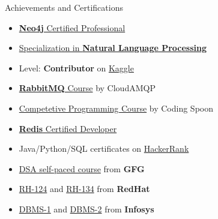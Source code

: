 \documentclass{resume} %
\begin{document}
\begin{rSection}{Achievements and Certifications}
    \begin{minipage}[t]{0.45\textwidth}
        \begin{itemize}[noitemsep]
            \item \href{https://graphacademy.neo4j.com/c/5fc672a6-5bf9-4611-aaba-bbe70f24ede8/}{{\bf Neo4j} Certified Professional}
            \item \href{https://www.coursera.org/account/accomplishments/specialization/MPYFQ8ZQ6CFU?utm_source=link&utm_medium=certificate&utm_content=cert_image&utm_campaign=sharing_cta&utm_product=s12n}{Specialization in {\bf Natural Language Processing}}
            \item Level: \textbf{Contributor} on \href{https://www.kaggle.com/armangrewal007}{Kaggle}
            \item \href{https://training.cloudamqp.com/certificate/baf7532e-4c44-42c0-b648-5be37e25782c}{{\bf RabbitMQ} Course} by CloudAMQP
            \item \href{https://certifier-production-storage.s3.eu-west-1.amazonaws.com/683f7a6a-470c-42bd-b283-623e009780ad/pdf-files/393e3982-3da1-45f5-9fa7-ca764f6a7b5e.pdf}{Competetive Programming Course} by Coding Spoon
        \end{itemize}
    \end{minipage}
    \hfill
    \begin{minipage}[t]{0.45\textwidth}
        \begin{itemize}[noitemsep]
            \item \href{https://www.credential.net/cb32c58d-9454-4170-9d56-4da8edaafab2#gs.bxuysm}{{\bf Redis} Certified Developer}
            \item Java/Python/SQL certificates on \href{https://www.hackerrank.com/profile/armansinghgrewal}{HackerRank}
            \item \href{https://media.geeksforgeeks.org/courses/certificates/b8aa98918f9316c64809221070cf861e.pdf}{DSA self-paced course} from \textbf{GFG}
            \item \href{https://rha.ole.redhat.com/rha/api/certificates/attendance/uuid/25af4309-51c1-42bd-9c83-4653423b454c}{RH-124} and \href{https://rha.ole.redhat.com/rha/api/certificates/attendance/uuid/25af4309-51c1-42bd-9c83-4653423b454c}{RH-134} from \textbf{RedHat}
            \item \href{https://drive.google.com/file/d/13pBxS03kjjsSEkm9PChN73F3Vn5aaET3/view}{DBMS-1} and \href{https://drive.google.com/file/d/1MkskNH-SHX6BsAvWD9SyxI8sTi-Q_JtX/view}{DBMS-2} from \textbf{Infosys}
        \end{itemize}
    \end{minipage}
\end{rSection}
\end{document}
